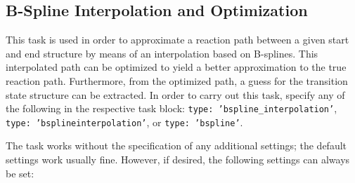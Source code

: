 \documentclass[]{tufte-book}
\begin{document}
\subsection{B-Spline Interpolation and Optimization}

This task is used in order to approximate a reaction path between a given start and end structure by means of an
interpolation based on B-splines\cite{bsplines}. This interpolated path can be optimized to yield a better approximation
to the true reaction path. Furthermore, from the optimized path, a guess for the transition state structure can be
extracted. In order to carry out this task, specify any of the following in the respective task block: \texttt{type: 'bspline\_interpolation'}, 
\texttt{type: 'bsplineinterpolation'}, or \texttt{type: 'bspline'}.

The task works without the specification of any additional settings; the default settings work usually fine. However,
if desired, the following settings can always be set:
\end{document}
